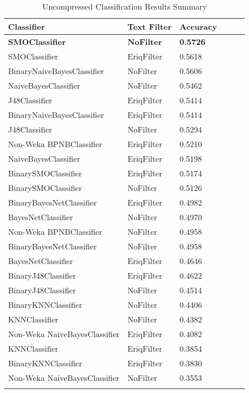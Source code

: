 \begin{center}
   \begin{longtable}{|l|l|l|c|c|c|}
      \hline
         Classifier & Text Filter & Accuracy
      \tabularnewline\hline
         \textbf{SMOClassifier} & \textbf{NoFilter} & \textbf{0.5726}
      \tabularnewline\hline
         SMOClassifier & EriqFilter & 0.5618
      \tabularnewline\hline
         BinaryNaiveBayesClassifier & NoFilter & 0.5606
      \tabularnewline\hline
         NaiveBayesClassifier & NoFilter & 0.5462
      \tabularnewline\hline
         J48Classifier & EriqFilter & 0.5414
      \tabularnewline\hline
         BinaryNaiveBayesClassifier & EriqFilter & 0.5414
      \tabularnewline\hline
         J48Classifier & NoFilter & 0.5294
      \tabularnewline\hline
         Non-Weka BPNBClassifier & EriqFilter & 0.5210
      \tabularnewline\hline
         NaiveBayesClassifier & EriqFilter & 0.5198
      \tabularnewline\hline
         BinarySMOClassifier & EriqFilter & 0.5174
      \tabularnewline\hline
         BinarySMOClassifier & NoFilter & 0.5126
      \tabularnewline\hline
         BinaryBayesNetClassifier & EriqFilter & 0.4982
      \tabularnewline\hline
         BayesNetClassifier & NoFilter & 0.4970
      \tabularnewline\hline
         Non-Weka BPNBClassifier & NoFilter & 0.4958
      \tabularnewline\hline
         BinaryBayesNetClassifier & NoFilter & 0.4958
      \tabularnewline\hline
         BayesNetClassifier & EriqFilter & 0.4646
      \tabularnewline\hline
         BinaryJ48Classifier & EriqFilter & 0.4622
      \tabularnewline\hline
         BinaryJ48Classifier & NoFilter & 0.4514
      \tabularnewline\hline
         BinaryKNNClassifier & NoFilter & 0.4406
      \tabularnewline\hline
         KNNClassifier & NoFilter & 0.4382
      \tabularnewline\hline
         Non-Weka NaiveBayesClassifier & EriqFilter & 0.4082
      \tabularnewline\hline
         KNNClassifier & EriqFilter & 0.3854
      \tabularnewline\hline
         BinaryKNNClassifier & EriqFilter & 0.3830
      \tabularnewline\hline
         Non-Weka NaiveBayesClassifier & NoFilter & 0.3553
      \tabularnewline\hline
      \caption[Uncompressed Classification Results Summary]{Uncompressed Classification Results Summary}
      \label{table:classification-summary-uncompressed}
   \end{longtable}
\end{center}

